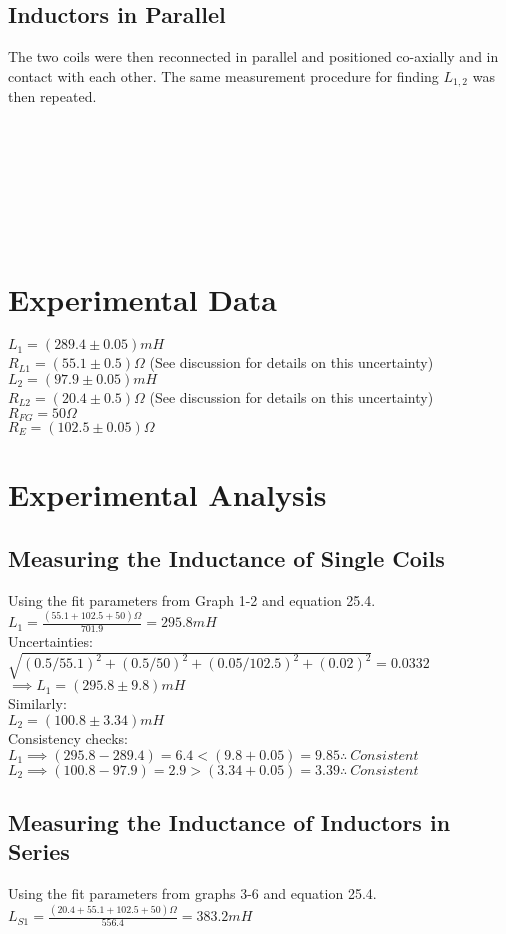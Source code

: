 \documentclass{article}
\begin{document}
\subsection{Inductors in Parallel}
The two coils were then reconnected in parallel and positioned co-axially and in contact with each other. The same measurement procedure for finding $L_{1,2}$ was then repeated.
\ 
\ 

\ 
\ 

\ 
\ 

\ 

\ 
\section{Experimental Data}
$L_1=(289.4\pm0.05)mH$\\
$R_{L1}=(55.1\pm0.5)\Omega$ (See discussion for details on this uncertainty)\\
$L_2=(97.9\pm0.05)mH$\\
$R_{L2}=(20.4\pm0.5)\Omega$ (See discussion for details on this uncertainty)\\
$R_{FG}=50\Omega$\\
$R_{E}=(102.5\pm0.05)\Omega$
\section{Experimental Analysis}
\subsection{Measuring the Inductance of Single Coils}
Using the fit parameters from Graph 1-2 and equation 25.4.\\
$L_1=\frac{(55.1+102.5+50)\Omega}{701.9}=295.8mH$\\

Uncertainties:\\
$\sqrt{(0.5/55.1)^2+(0.5/50)^2+(0.05/102.5)^2+(0.02)^2}=0.0332$\\
$\implies L_1=(295.8\pm9.8)mH$\\

Similarly:\\
$L_2=(100.8\pm3.34)mH$\\

Consistency checks:\\
$L_1\implies (295.8-289.4)=6.4<(9.8+0.05)=9.85\therefore\ Consistent$\\

$L_2\implies (100.8-97.9)=2.9>(3.34+0.05)=3.39\therefore\ Consistent$
\subsection{Measuring the Inductance of Inductors in Series}
Using the fit parameters from graphs 3-6 and equation 25.4.\\
$L_{S1}=\frac{(20.4+55.1+102.5+50)\Omega}{556.4}=383.2mH$\\
\end{document}
